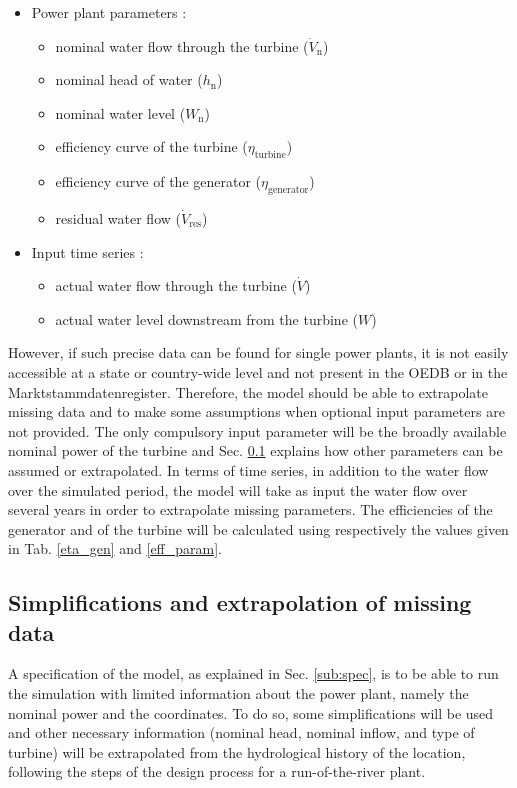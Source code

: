 \begin{itemize}
\itemsep0em
 \item Power plant parameters : 
 \begin{itemize}
  \item nominal water flow through the turbine ($\dot{V}_\mathrm{n}$)
  \item nominal head of water ($h_\mathrm{n}$)
  \item nominal water level ($W_\mathrm{n}$)
  \item efficiency curve of the turbine ($\eta_\mathrm{turbine}$) 
  \item efficiency curve of the generator ($\eta_\mathrm{generator}$)  
  \item residual water flow ($\dot{V}_\mathrm{res}$)  
 \end{itemize}
 \item Input time series : 
 \begin{itemize}
  \item actual water flow through the turbine ($\dot{V}$)
  \item actual water level downstream from the turbine ($W$)
 \end{itemize}
\end{itemize}

However, if such precise data can be found for single power plants, it is not easily accessible at a state or country-wide level and not present in the OEDB or in the Marktstammdatenregister. 
Therefore, the model should be able to extrapolate missing data and to make some assumptions when optional input parameters are not provided. The only compulsory input parameter will be the broadly available nominal power of the turbine and Sec. \ref{sub:assumptions} explains how other parameters can be assumed or extrapolated. \newline
In terms of time series, in addition to the water flow over the simulated period, the model will take as input the water flow over several years in order to extrapolate missing parameters.
The efficiencies of the generator and of the turbine will be calculated using respectively the values given in Tab. \ref{eta_gen} and \ref{eff_param}.

\subsection{Simplifications and extrapolation of missing data}
\label{sub:assumptions}

A specification of the model, as explained in Sec. \ref{sub:spec}, is to be able to run the simulation with limited information about the power plant, namely the nominal power and the coordinates. To do so, some simplifications will be used and other necessary information (nominal head, nominal inflow, and type of turbine) will be extrapolated from the hydrological history of the location, following the steps of the design process for a run-of-the-river plant.
